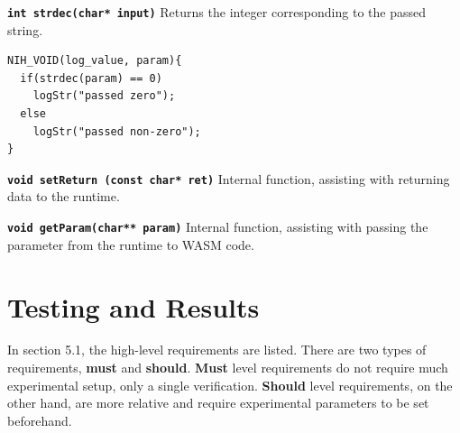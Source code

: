 \documentclass{article}
\begin{document}
\textbf{\texttt{int strdec(char* input)}}\newline
Returns the integer corresponding to the passed string.

\begin{tcolorbox}[colback=white,grow to left by=2.5mm,grow to right by=2.5mm,left*=0mm,right*=0mm,sharp corners]
\begin{verbatim}
NIH_VOID(log_value, param){
  if(strdec(param) == 0) 
    logStr("passed zero");
  else
    logStr("passed non-zero");
}
\end{verbatim}
\end{tcolorbox}

\textbf{\texttt{void setReturn (const char* ret)}}\newline
Internal function, assisting with returning data to the runtime.

\textbf{\texttt{void getParam(char** param)}}\newline
Internal function, assisting with passing the parameter from the runtime to WASM code.

\section{Testing and Results}

In section 5.1, the high-level requirements are listed. There are two types of requirements, \textbf{must} and \textbf{should}. \textbf{Must} level requirements do not require much experimental setup, only a single verification. \textbf{Should} level requirements, on the other hand, are more relative and require experimental parameters to be set beforehand.
\end{document}
